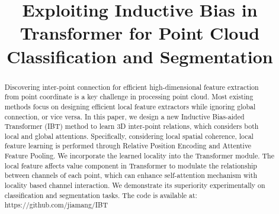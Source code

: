 \documentclass[conference]{IEEEtran}
\begin{document}
\title{Exploiting Inductive Bias in Transformer for Point Cloud  Classification and Segmentation}


\author{
\and
{}
\and
{}
\and
{}
\and
}

\maketitle

\begin{abstract}
Discovering inter-point connection for efficient high-dimensional feature extraction from point coordinate is a key challenge in processing point cloud. Most existing methods focus on designing efficient local feature extractors while ignoring global connection, or vice versa. In this paper, we design a new Inductive Bias-aided Transformer (IBT) method to learn 3D inter-point relations, which considers both local and global attentions. Specifically, considering local spatial coherence, local feature learning is performed through Relative Position Encoding and Attentive Feature Pooling. We incorporate the learned locality into the Transformer module. The local feature affects value component in Transformer to modulate the relationship between channels of each point, which can enhance self-attention mechanism with locality based channel interaction. We demonstrate its superiority experimentally on  classification and segmentation tasks. The code is available at: https://github.com/jiamang/IBT
\end{abstract}
\end{document}
